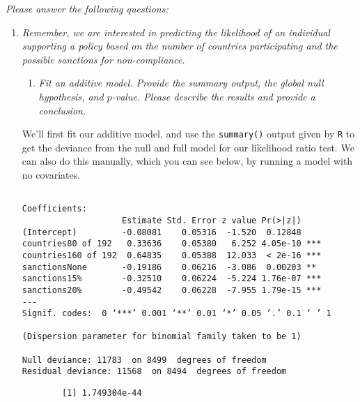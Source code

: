 \documentclass[12pt,letterpaper]{article}
\begin{document}
\newpage
\noindent \textit{Please answer the following questions:}

\begin{enumerate}
	\item
	\textit{Remember, we are interested in predicting the likelihood of an individual supporting a policy based on the number of countries participating and the possible sanctions for non-compliance.}
	\begin{enumerate}
		\item [] \textit{Fit an additive model. Provide the summary output, the global null hypothesis, and $p$-value. Please describe the results and provide a conclusion.}
	
	\end{enumerate}
	
		We’ll first fit our additive model, and use the \texttt{summary()} output given by \texttt{R} to get the deviance from the null and full model for our likelihood ratio test. We can also do this manually, which you can see below, by running a model with no covariates.
		
	 
	
	\begin{verbatim}

Coefficients:
                    Estimate Std. Error z value Pr(>|z|)    
(Intercept)         -0.08081    0.05316  -1.520  0.12848    
countries80 of 192   0.33636    0.05380   6.252 4.05e-10 ***
countries160 of 192  0.64835    0.05388  12.033  < 2e-16 ***
sanctionsNone       -0.19186    0.06216  -3.086  0.00203 ** 
sanctions15%        -0.32510    0.06224  -5.224 1.76e-07 ***
sanctions20%        -0.49542    0.06228  -7.955 1.79e-15 ***
---
Signif. codes:  0 ‘***’ 0.001 ‘**’ 0.01 ‘*’ 0.05 ‘.’ 0.1 ‘ ’ 1

(Dispersion parameter for binomial family taken to be 1)

Null deviance: 11783  on 8499  degrees of freedom
Residual deviance: 11568  on 8494  degrees of freedom\end{verbatim}
	
	 
	
	\begin{verbatim}
		[1] 1.749304e-44
	\end{verbatim}

	 
	

\end{enumerate}
\end{document}
